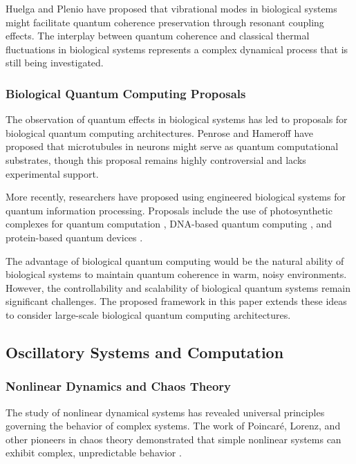 \documentclass[12pt,a4paper]{article}
\theoremstyle{definition}
\begin{document}
{Huelga and Plenio \cite{huelga2013vibrations} have proposed that vibrational modes in biological systems might facilitate quantum coherence preservation through resonant coupling effects. The interplay between quantum coherence and classical thermal fluctuations in biological systems represents a complex dynamical process that is still being investigated.

\subsubsection{Biological Quantum Computing Proposals}

The observation of quantum effects in biological systems has led to proposals for biological quantum computing architectures. Penrose and Hameroff \cite{penrose1996conscious} have proposed that microtubules in neurons might serve as quantum computational substrates, though this proposal remains highly controversial and lacks experimental support.

More recently, researchers have proposed using engineered biological systems for quantum information processing. Proposals include the use of photosynthetic complexes for quantum computation \cite{ishizaki2009theoretical}, DNA-based quantum computing \cite{lloyd2004quantum}, and protein-based quantum devices \cite{davies2004quantum}.

The advantage of biological quantum computing would be the natural ability of biological systems to maintain quantum coherence in warm, noisy environments. However, the controllability and scalability of biological quantum systems remain significant challenges. The proposed framework in this paper extends these ideas to consider large-scale biological quantum computing architectures.

\subsection{Oscillatory Systems and Computation}

\subsubsection{Nonlinear Dynamics and Chaos Theory}

The study of nonlinear dynamical systems has revealed universal principles governing the behavior of complex systems. The work of Poincaré, Lorenz, and other pioneers in chaos theory demonstrated that simple nonlinear systems can exhibit complex, unpredictable behavior \cite{lorenz1963deterministic}.

}
\end{document}
